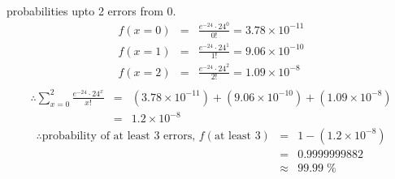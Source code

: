 \documentclass{article}
\begin{document}
{    \hspace{1.5em}probabilities upto 2 errors from 0.
    \begin{eqnarray*}
        f(x=0) &=& \frac{e^{-24}\cdot 24^0}{0!} = 3.78\times10^{-11}\\
        f(x=1) &=& \frac{e^{-24}\cdot 24^1}{1!} = 9.06\times10^{-10}\\
        f(x=2) &=& \frac{e^{-24}\cdot 24^2}{2!} = 1.09\times10^{-8}\\
    \end{eqnarray*}
    \begin{eqnarray*}
        \therefore \sum_{x=0}^{2} \frac{e^{-24}\cdot 24^x}{x!} &=& (3.78\times 10^{-11}) + (9.06 \times 10^{-10}) + (1.09 \times 10^{-8})\\
        &=& 1.2\times 10^{-8}
    \end{eqnarray*}
    \begin{eqnarray*}
        \therefore \text{probability of at least 3 errors, } f(\text{at least 3}) &=& 1 - (1.2\times 10^{-8})\\
        &=& 0.9999999882\\
        &\approx& 99.99\;\%
    \end{eqnarray*}



}
\end{document}
